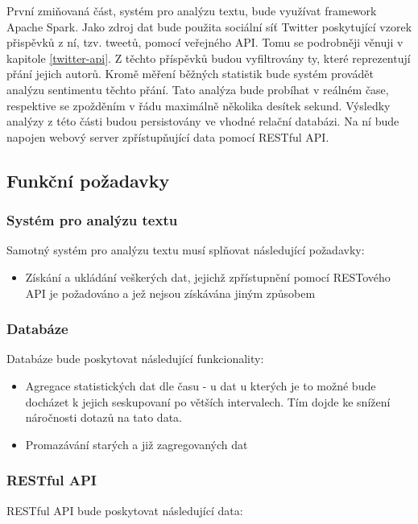 \documentclass[thesis=B,czech]{FITthesis}[2012/06/26]
\begin{document}
	 První zmiňovaná část, systém pro analýzu textu, bude využívat framework Apache Spark. Jako zdroj dat bude použita sociální síť Twitter poskytující vzorek přispěvků z ní, tzv. tweetů, pomocí veřejného API. Tomu se podrobněji věnuji v kapitole \ref{twitter-api}. Z těchto příspěvků budou vyfiltrovány ty, které reprezentují přání jejich autorů. Kromě měření běžných statistik bude systém provádět analýzu sentimentu těchto přání. Tato analýza bude probíhat v reálném čase, respektive se zpožděním v řádu maximálně několika desítek sekund.  Výsledky analýzy z této části budou persistovány ve vhodné relační databázi. Na ní bude napojen webový server zpřístupňující data pomocí RESTful API. 

\subsection{Funkční požadavky}
\subsubsection{Systém pro analýzu textu}
Samotný systém pro analýzu textu musí splňovat následující požadavky:
\begin{itemize}
\item Získání a ukládání veškerých dat, jejichž zpřístupnění pomocí RESTového API je požadováno a jež nejsou získávána jiným způsobem
\end{itemize}
\subsubsection{Databáze}
 Databáze bude poskytovat následující funkcionality:
\begin{itemize}
\item Agregace statistických dat dle času - u dat u kterých je to možné bude docházet k jejich seskupovaní po větších intervalech. Tím dojde ke snížení náročnosti dotazů na tato data. 
\item Promazávání starých a již zagregovaných dat
\end{itemize}
\subsubsection{RESTful API}
RESTful API bude poskytovat následující data:
\end{document}
